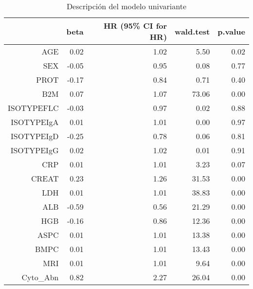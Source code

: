 \begin{table}[ht]
\centering
\begin{tabular}{rrrrr}
  \hline
 & beta & HR (95\% CI for HR) & wald.test & p.value \\ 
  \hline
AGE & 0.02 & 1.02 & 5.50 & 0.02 \\ 
  SEX & -0.05 & 0.95 & 0.08 & 0.77 \\ 
  PROT & -0.17 & 0.84 & 0.71 & 0.40 \\ 
  B2M & 0.07 & 1.07 & 73.06 & 0.00 \\ 
  ISOTYPEFLC & -0.03 & 0.97 & 0.02 & 0.88 \\ 
  ISOTYPEIgA & 0.01 & 1.01 & 0.00 & 0.97 \\ 
  ISOTYPEIgD & -0.25 & 0.78 & 0.06 & 0.81 \\ 
  ISOTYPEIgG & 0.02 & 1.02 & 0.01 & 0.91 \\ 
  CRP & 0.01 & 1.01 & 3.23 & 0.07 \\ 
  CREAT & 0.23 & 1.26 & 31.53 & 0.00 \\ 
  LDH & 0.01 & 1.01 & 38.83 & 0.00 \\ 
  ALB & -0.59 & 0.56 & 21.29 & 0.00 \\ 
  HGB & -0.16 & 0.86 & 12.36 & 0.00 \\ 
  ASPC & 0.01 & 1.01 & 13.38 & 0.00 \\ 
  BMPC & 0.01 & 1.01 & 13.43 & 0.00 \\ 
  MRI & 0.01 & 1.01 & 9.64 & 0.00 \\ 
  Cyto\_Abn & 0.82 & 2.27 & 26.04 & 0.00 \\ 
   \hline
\end{tabular}
\caption{Descripción del modelo univariante} 
\label{Tabla: Cox Univariante}
\end{table}
